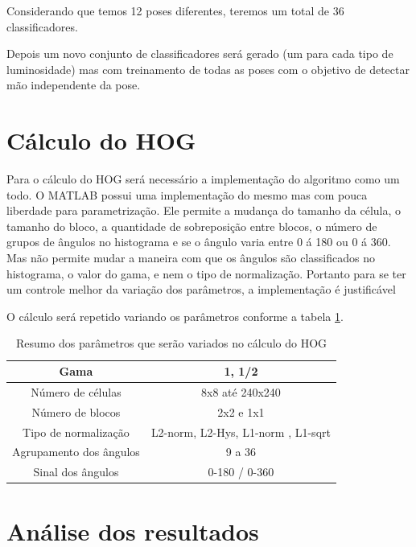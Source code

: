 Considerando que temos 12 poses diferentes, teremos um total de 36 classificadores.
 
Depois um novo conjunto de classificadores será gerado (um para cada tipo de luminosidade) mas com treinamento de todas as poses com o objetivo de detectar mão independente da pose.


\section{Cálculo do HOG}

Para o cálculo do HOG será necessário a implementação do algoritmo como um todo. O MATLAB \cite{MATLAB:2013} possui uma implementação do mesmo mas com pouca liberdade para parametrização. Ele permite a mudança do tamanho da célula, o tamanho do bloco, a quantidade de sobreposição entre blocos, o número de grupos de ângulos no histograma e se o ângulo varia entre 0 á 180 ou 0 á 360. Mas não permite mudar a maneira com que os ângulos são classificados no histograma, o valor do gama, e nem o tipo de normalização. Portanto para se ter um controle melhor da variação dos parâmetros, a implementação é justificável

O cálculo será repetido variando os parâmetros conforme a tabela \ref{table:hog_var}.

\begin{table}[H]
	\centering
	\begin{tabular}{|c|c|}
	\hline
		Gama 					& 1, 1/2 				\\
	\hline  
		Número de células 		&  8x8 até 240x240 		\\ 
	\hline  
		Número de blocos  		&  2x2 e 1x1 			\\ 
	\hline 
		Tipo de normalização  	&  L2-norm, L2-Hys,  L1-norm , L1-sqrt 										\\ 
	\hline 
		Agrupamento dos ângulos	&  9 a 36				\\ 
	\hline
		Sinal dos ângulos		& 0-180 / 0-360			\\
	\hline		
	\end{tabular} 
	\caption{Resumo dos parâmetros que serão variados no cálculo do HOG}
	\label{table:hog_var}
\end{table}

\section{Análise dos resultados}

